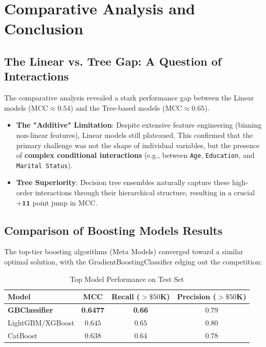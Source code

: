 \chapter{Comparative Analysis and Conclusion}
\label{cp:conclusion}

\section{The Linear vs. Tree Gap: A Question of Interactions}
\label{sec:gap}
The comparative analysis revealed a stark performance gap between the Linear models ($\text{MCC} \approx 0.54$) and the Tree-based models ($\text{MCC} \approx 0.65$).
\begin{itemize}
    \item \textbf{The "Additive" Limitation}: Despite extensive feature engineering (binning non-linear features), Linear models still plateaued. This confirmed that the primary challenge was not the shape of individual variables, but the presence of \textbf{complex conditional interactions} (e.g., between \texttt{Age}, \texttt{Education}, and \texttt{Marital Status}).
    \item \textbf{Tree Superiority}: Decision tree ensembles naturally capture these high-order interactions through their hierarchical structure, resulting in a crucial $\mathbf{+11}$ point jump in $\text{MCC}$.
\end{itemize}

\vspace{1 \baselineskip}
\section{Comparison of Boosting Models Results}
\label{sec:comparison}
The top-tier boosting algorithms (Meta Models) converged toward a similar optimal solution, with the GradientBoostingClassifier edging out the competition:

\begin{table}[H]
    \centering
    \caption{Top Model Performance on Test Set}
    \begin{tabular}{||l|c|c|c||}
        \hline
        \textbf{Model} & \textbf{MCC} & \textbf{Recall ($>\$50$K)} & \textbf{Precision ($>\$50$K)} \\
        \hline
        \textbf{GBClassifier} & \textbf{0.6477} & \textbf{0.66} & 0.79 \\
        LightGBM/XGBoost & $0.645$ & $0.65$ & $0.80$ \\
        CatBoost & 0.638 & 0.64 & 0.78 \\
        \hline
    \end{tabular}
\end{table}

